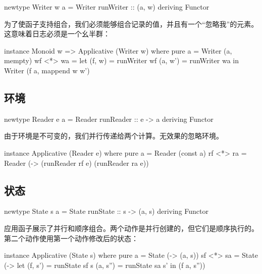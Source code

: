 \documentclass[DaoFP]{subfiles}
\begin{document}
\begin{haskell}
newtype Writer w a = Writer { runWriter :: (a, w) }
  deriving Functor
\end{haskell}

为了使函子支持组合，我们必须能够组合记录的值，并且有一个“忽略我”的元素。这意味着日志必须是一个幺半群：
\begin{haskell}
instance Monoid w => Applicative (Writer w) where
  pure a = Writer (a, mempty)
  wf <*> wa = let (f, w)  = runWriter wf
                  (a, w') = runWriter wa
              in Writer (f a, mappend w w')
\end{haskell}

\subsection{环境}
\begin{haskell}
newtype Reader e a = Reader { runReader :: e -> a }
  deriving Functor
\end{haskell}

由于环境是不可变的，我们并行传递给两个计算。无效果的忽略环境。
\begin{haskell}
instance Applicative (Reader e) where
  pure a = Reader (const a)
  rf <*> ra = Reader (\e -> (runReader rf e) (runReader ra e))
\end{haskell}

\subsection{状态}
\begin{haskell}
newtype State s a = State { runState :: s -> (a, s) }
  deriving Functor
\end{haskell}

应用函子展示了并行和顺序组合。两个动作是并行创建的，但它们是顺序执行的。第二个动作使用第一个动作修改后的状态：
\begin{haskell}
instance Applicative (State s) where
  pure a = State (\s -> (a, s))
  sf <*> sa = State (\s ->
    let (f, s')  = runState sf s
        (a, s'') = runState sa s' 
    in (f a, s''))
\end{haskell}
\end{document}
